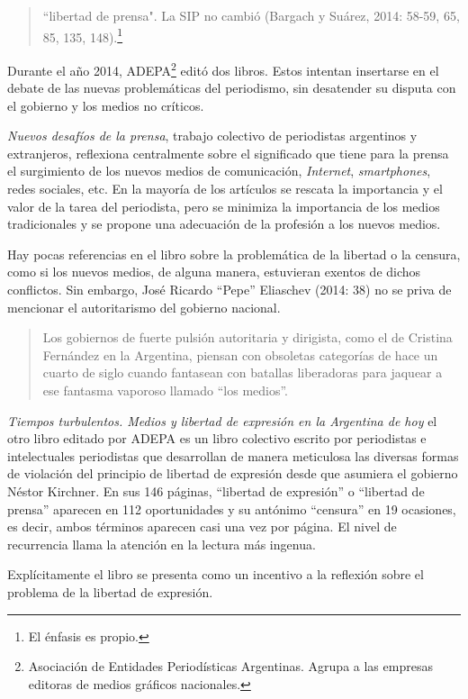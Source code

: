 \begin{quote}
``libertad de prensa". La SIP no cambió (Bargach y Suárez, 2014: 58-59, 65, 85, 135, 148).\footnote{El énfasis es propio.}
\end{quote}

Durante el año 2014, ADEPA\footnote{Asociación de Entidades Periodísticas Argentinas. Agrupa a las empresas editoras de medios gráficos nacionales.} editó dos libros. Estos intentan insertarse en el debate de las nuevas problemáticas del periodismo, sin desatender su disputa con el gobierno y los medios no críticos.

\emph{Nuevos desafíos de la prensa}, trabajo colectivo de periodistas argentinos y extranjeros, reflexiona centralmente sobre el significado que tiene para la prensa el surgimiento de los nuevos medios de comunicación, \emph{Internet}, \emph{smartphones}, redes sociales, etc. En la mayoría de los artículos se rescata la importancia y el valor de la tarea del periodista, pero se minimiza la importancia de los medios tradicionales y se propone una adecuación de la profesión a los nuevos medios.

Hay pocas referencias en el libro sobre la problemática de la libertad o la censura, como si los nuevos medios, de alguna manera, estuvieran exentos de dichos conflictos. Sin embargo, José Ricardo ``Pepe'' Eliaschev (2014: 38) no se priva de mencionar el autoritarismo del gobierno nacional.

\begin{quote}
Los gobiernos de fuerte pulsión autoritaria y dirigista, como el de Cristina Fernández en la Argentina, piensan con obsoletas categorías de hace un cuarto de siglo cuando fantasean con batallas liberadoras para jaquear a ese fantasma vaporoso llamado ``los medios''.
\end{quote}

\emph{Tiempos turbulentos. Medios y libertad de expresión en la Argentina de hoy} el otro libro editado por ADEPA es un libro colectivo escrito por periodistas e intelectuales periodistas que desarrollan de manera meticulosa las diversas formas de violación del principio de libertad de expresión desde que asumiera el gobierno Néstor Kirchner. En sus 146 páginas, ``libertad de expresión'' o ``libertad de prensa'' aparecen en 112 oportunidades y su antónimo ``censura'' en 19 ocasiones, es decir, ambos términos aparecen casi una vez por página. El nivel de recurrencia llama la atención en la lectura más ingenua.

Explícitamente el libro se presenta como un incentivo a la reflexión sobre el problema de la libertad de expresión.

